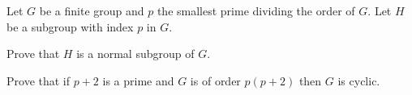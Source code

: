 Let $G$ be a finite group and $p$ the smallest prime dividing the
order of $G$. Let $H$ be a subgroup with index $p$ in $G$.
\begin{alist}
\item Prove that $H$ is a normal subgroup of $G$.
\item Prove that if $p+2$ is a prime and $G$ is of order $p(p+2)$ 
then $G$ is cyclic.
\end{alist}
